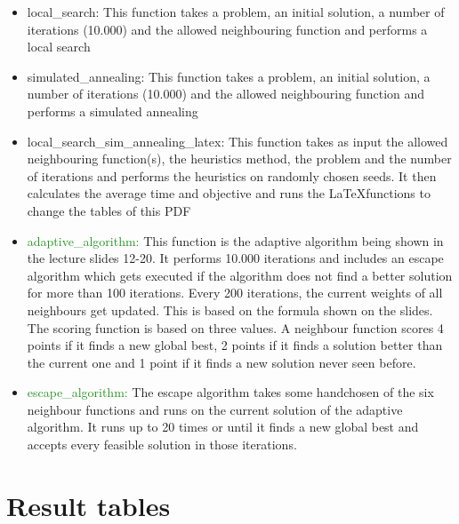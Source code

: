 \documentclass[a4paper,11pt]{article}
\theoremstyle{mytheor}
\begin{document}
\begin{itemize}
\item local\_search: This function takes a problem, an initial solution, a number of iterations (10.000) and the allowed neighbouring function and performs a local search
\item simulated\_annealing: This function takes a problem, an initial solution, a number of iterations (10.000) and the allowed neighbouring function and performs a simulated annealing
\item local\_search\_sim\_annealing\_latex: This function takes as input the allowed neighbouring function(s), the heuristics method, the problem and the number of iterations and performs the heuristics on randomly chosen seeds. It then calculates the average time and objective and runs the \LaTeX functions to change the tables of this PDF
\item \textcolor{ForestGreen}{adaptive\_algorithm: }This function is the adaptive algorithm being shown in the lecture slides 12-20. It performs 10.000 iterations and includes an escape algorithm which gets executed if the algorithm does not find a better solution for more than 100 iterations. Every 200 iterations, the current weights of all neighbours get updated. This is based on the formula shown on the slides. The scoring function is based on three values. A neighbour function scores 4 points if it finds a new global best, 2 points if it finds a solution better than the current one and 1 point if it finds a new solution never seen before.
\item \textcolor{ForestGreen}{escape\_algorithm: }The escape algorithm takes some handchosen of the six neighbour functions and runs on the current solution of the adaptive algorithm. It runs up to 20 times or until it finds a new global best and accepts every feasible solution in those iterations.
\end{itemize}

\clearpage

\section{Result tables}

\end{document}
